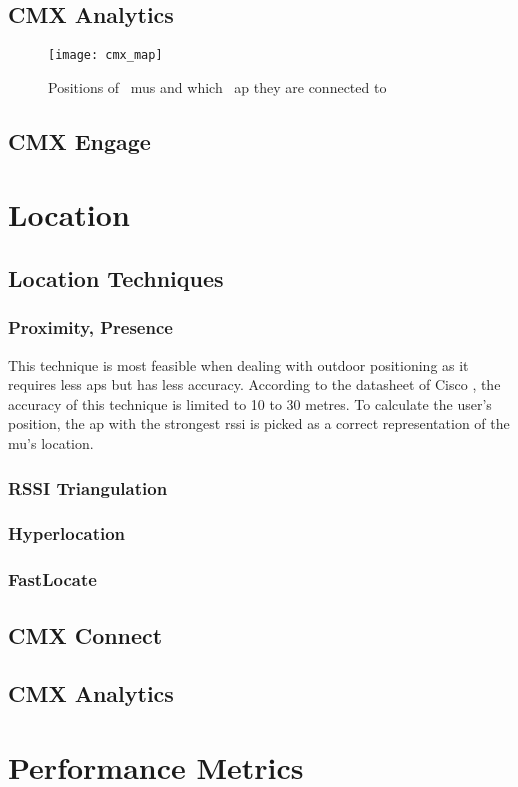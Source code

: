 \subsection{CMX Analytics}
\begin{figure}[h!]
\centering
\texttt{[image: cmx\_map]}
\caption{Positions of ~\acrlong{mu}s and which ~\acrlong{ap} they are connected to ~\cite{Shah2015a}}
\label{fig:toa}
\end{figure}
\subsection{CMX Engage}
\section{Location}
\subsection{Location Techniques}
\subsubsection{Proximity, Presence}
This technique is most feasible when dealing with outdoor positioning as it requires less \acrlong{ap}s but has less accuracy. According to the datasheet of Cisco \cite{Ciscoa}, the accuracy of this technique is limited to 10 to 30 metres. To calculate the user's position, the \acrshort{ap} with the strongest \acrlong{rssi} is picked as a correct representation of the \acrshort{mu}'s location.
\subsubsection{RSSI Triangulation}
\subsubsection{Hyperlocation}
\subsubsection{FastLocate}
\subsection{CMX Connect}
\subsection{CMX Analytics}
\section{Performance Metrics}
